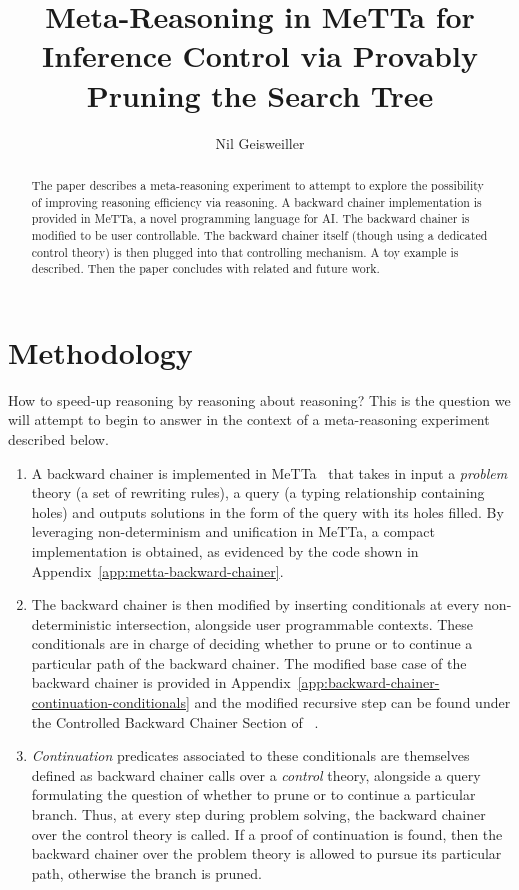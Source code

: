\documentclass{easychair}
\title{Meta-Reasoning in MeTTa for Inference Control via Provably
  Pruning the Search Tree}
\author{Nil Geisweiller}
\institute{
  SingularityNET Foundation,\\
  Zug, Switzerland\\
  \email{nil@singularitynet.io}
}
\begin{document}
\maketitle

\begin{abstract}
The paper describes a meta-reasoning experiment to attempt to explore
the possibility of improving reasoning efficiency via reasoning. A
backward chainer implementation is provided in MeTTa, a novel
programming language for AI. The backward chainer is modified to be
user controllable. The backward chainer itself (though using a
dedicated control theory) is then plugged into that controlling
mechanism. A toy example is described. Then the paper concludes with
related and future work.
\end{abstract}

\section{Methodology}
\label{sect:introduction}

How to speed-up reasoning by reasoning about reasoning?  This is the
question we will attempt to begin to answer in the context of a
meta-reasoning experiment described below.
\begin{enumerate}
\item A backward chainer is implemented in MeTTa~\cite{MeTTa} that
  takes in input a \emph{problem} theory (a set of rewriting rules), a
  query (a typing relationship containing holes) and outputs solutions
  in the form of the query with its holes filled.  By leveraging
  non-determinism and unification in MeTTa, a compact implementation
  is obtained, as evidenced by the code shown in
  Appendix~\ref{app:metta-backward-chainer}.
\item The backward chainer is then modified by inserting conditionals
  at every non-deterministic intersection, alongside user programmable
  contexts.  These conditionals are in charge of deciding whether to
  prune or to continue a particular path of the backward chainer.  The
  modified base case of the backward chainer is provided in
  Appendix~\ref{app:backward-chainer-continuation-conditionals} and
  the modified recursive step can be found under the Controlled
  Backward Chainer Section of ~\cite{Geisweiller2024ICM}.
\item \emph{Continuation} predicates associated to these conditionals
  are themselves defined as backward chainer calls over a
  \emph{control} theory, alongside a query formulating the question of
  whether to prune or to continue a particular branch.  Thus, at every
  step during problem solving, the backward chainer over the control
  theory is called.  If a proof of continuation is found, then the
  backward chainer over the problem theory is allowed to pursue its
  particular path, otherwise the branch is pruned.
\end{enumerate}
\end{document}
